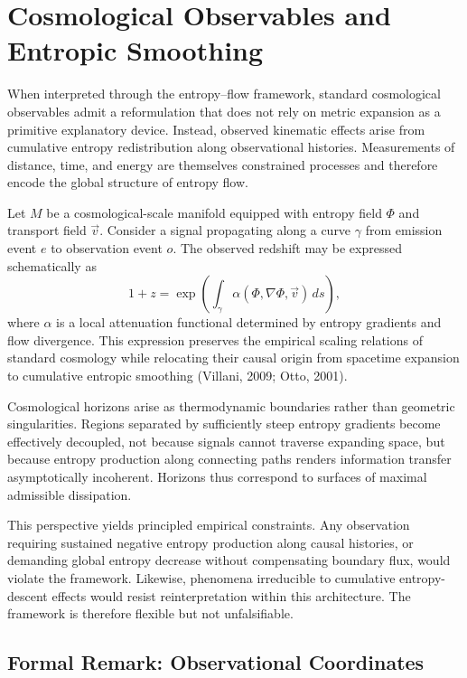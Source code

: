 \documentclass[11pt]{article}
\begin{document}
\bigskip

\section{Cosmological Observables and Entropic Smoothing}

When interpreted through the entropy–flow framework, standard cosmological observables admit a reformulation that does not rely on metric expansion as a primitive explanatory device. Instead, observed kinematic effects arise from cumulative entropy redistribution along observational histories. Measurements of distance, time, and energy are themselves constrained processes and therefore encode the global structure of entropy flow.

Let $M$ be a cosmological-scale manifold equipped with entropy field $\Phi$ and transport field $\vec{v}$. Consider a signal propagating along a curve $\gamma$ from emission event $e$ to observation event $o$. The observed redshift may be expressed schematically as
\[
1 + z
=
\exp\!\left(
\int_\gamma \alpha(\Phi, \nabla \Phi, \vec{v}) \, ds
\right),
\]
where $\alpha$ is a local attenuation functional determined by entropy gradients and flow divergence. This expression preserves the empirical scaling relations of standard cosmology while relocating their causal origin from spacetime expansion to cumulative entropic smoothing (Villani, 2009; Otto, 2001).

Cosmological horizons arise as thermodynamic boundaries rather than geometric singularities. Regions separated by sufficiently steep entropy gradients become effectively decoupled, not because signals cannot traverse expanding space, but because entropy production along connecting paths renders information transfer asymptotically incoherent. Horizons thus correspond to surfaces of maximal admissible dissipation.

This perspective yields principled empirical constraints. Any observation requiring sustained negative entropy production along causal histories, or demanding global entropy decrease without compensating boundary flux, would violate the framework. Likewise, phenomena irreducible to cumulative entropy-descent effects would resist reinterpretation within this architecture. The framework is therefore flexible but not unfalsifiable.

\subsection*{Formal Remark: Observational Coordinates}
\end{document}
